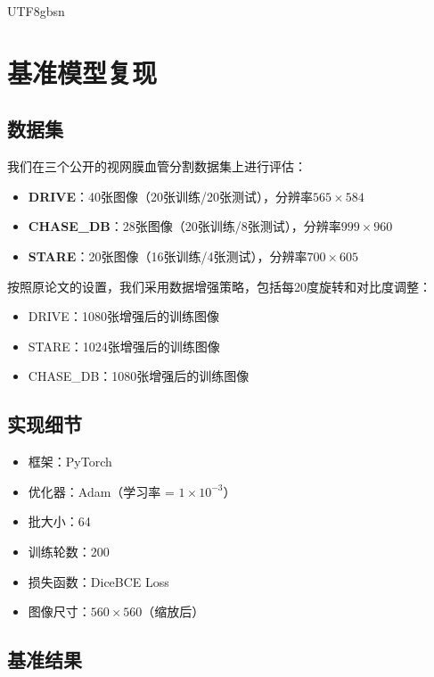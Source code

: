 \documentclass[conference]{IEEEtran}
\begin{document}
\begin{CJK}{UTF8}{gbsn}
\section{基准模型复现}

\subsection{数据集}

我们在三个公开的视网膜血管分割数据集上进行评估：

\begin{itemize}
    \item \textbf{DRIVE}\cite{staal2004ridge}：40张图像（20张训练/20张测试），分辨率$565 \times 584$
    \item \textbf{CHASE\_DB}\cite{fraz2012ensemble}：28张图像（20张训练/8张测试），分辨率$999 \times 960$
    \item \textbf{STARE}\cite{hoover2000locating}：20张图像（16张训练/4张测试），分辨率$700 \times 605$
\end{itemize}

按照原论文的设置，我们采用数据增强策略，包括每20度旋转和对比度调整：
\begin{itemize}
    \item DRIVE：1080张增强后的训练图像
    \item STARE：1024张增强后的训练图像
    \item CHASE\_DB：1080张增强后的训练图像
\end{itemize}

\subsection{实现细节}

\begin{itemize}
    \item 框架：PyTorch
    \item 优化器：Adam（学习率 = $1\times10^{-3}$）
    \item 批大小：64
    \item 训练轮数：200
    \item 损失函数：DiceBCE Loss
    \item 图像尺寸：$560 \times 560$（缩放后）
\end{itemize}

\subsection{基准结果}


\end{CJK}
\end{document}

